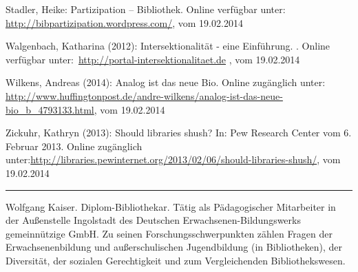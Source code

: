 \documentclass[a4paper,
fontsize=11pt,
oneside,
numbers=noperiodatend,
parskip=half-,
bibliography=totoc,
final
]{scrartcl}
\begin{document}
Stadler, Heike: Partizipation -- Bibliothek. Online verfügbar unter:~
\url{http://bibpartizipation.wordpress.com/}, vom 19.02.2014

Walgenbach, Katharina (2012): Intersektionalität - eine Einführung. .
Online verfügbar unter:~\url{http://portal-intersektionalitaet.de} , vom 19.02.2014

Wilkens, Andreas (2014): Analog ist das neue Bio. Online zugänglich
unter:~
\url{http://www.huffingtonpost.de/andre-wilkens/analog-ist-das-neue-bio_b_4793133.html},
vom 19.02.2014

Zickuhr, Kathryn (2013): Should libraries shush? In: Pew Research Center
vom 6. Februar 2013. Online zugänglich
unter:\url{http://libraries.pewinternet.org/2013/02/06/should-libraries-shush/},
vom 19.02.2014

\begin{center}\rule{3in}{0.4pt}\end{center}

Wolfgang Kaiser. Diplom-Bibliothekar. Tätig als Pädagogischer
Mitarbeiter in der Außenstelle Ingolstadt des Deutschen
Erwachsenen-Bildungswerks gemeinnützige GmbH. Zu seinen
Forschungsschwerpunkten zählen Fragen der Erwachsenenbildung und
außerschulischen Jugendbildung (in Bibliotheken), der Diversität, der
sozialen Gerechtigkeit und zum Vergleichenden Bibliothekswesen.
\end{document}
